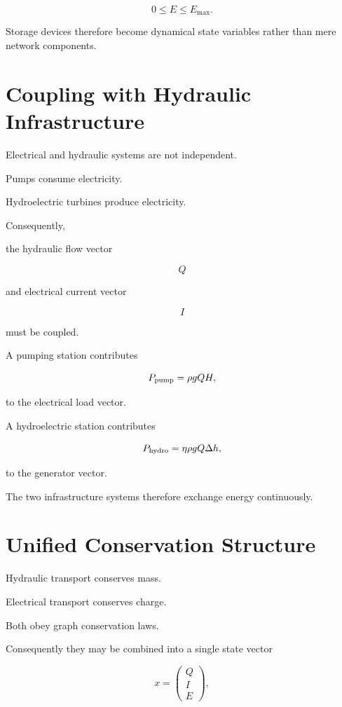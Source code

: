 \documentclass[11pt,fleqn]{book}
\numberwithin{equation}{chapter}
\theoremstyle{plain}
\theoremstyle{definition}
\theoremstyle{remark}
\begin{document}
\[
0
\le
E
\le
E_{\max}.
\]

Storage devices therefore become dynamical state variables rather than
mere network components.


\section{Coupling with Hydraulic Infrastructure}

Electrical and hydraulic systems are not independent.

Pumps consume electricity.

Hydroelectric turbines produce electricity.

Consequently,

the hydraulic flow vector

\[
Q
\]

and electrical current vector

\[
I
\]

must be coupled.

A pumping station contributes

\[
P_{\rm pump}
=
\rho gQH,
\]

to the electrical load vector.

A hydroelectric station contributes

\[
P_{\rm hydro}
=
\eta
\rho gQ\Delta h,
\]

to the generator vector.

The two infrastructure systems therefore exchange energy continuously.


\section{Unified Conservation Structure}

Hydraulic transport conserves mass.

Electrical transport conserves charge.

Both obey graph conservation laws.

Consequently they may be combined into a single state vector

\[
x
=
\begin{pmatrix}
Q\\
I\\
E
\end{pmatrix},
\]
\end{document}
